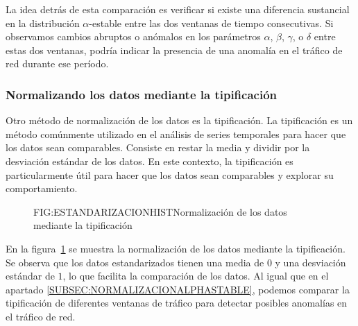 La idea detrás de esta comparación es verificar si existe una diferencia sustancial en la distribución $\alpha$-estable entre las dos ventanas de tiempo consecutivas. Si observamos cambios abruptos o anómalos en los parámetros $\alpha$, $\beta$, $\gamma$, o $\delta$ entre estas dos ventanas, podría indicar la presencia de una anomalía en el tráfico de red durante ese período.

\subsubsection{Normalizando los datos mediante la tipificaci\'on}\label{SUBSEC:NORMALIZACIONTIPIFICACION}

Otro método de normalización de los datos es la tipificación. La tipificación es un método comúnmente utilizado en el análisis de series temporales para hacer que los datos sean comparables. Consiste en restar la media y dividir por la desviación estándar de los datos. En este contexto, la tipificación es particularmente útil para hacer que los datos sean comparables y explorar su comportamiento.

\begin{figure}[Normalización de los datos mediante la tipificación]{FIG:ESTANDARIZACIONHIST}{Normalización de los datos mediante la tipificación}
    \label{FIG:ESTANDARIZACIONHIST}
\end{figure}

En la figura~\ref{FIG:ESTANDARIZACIONHIST} se muestra la normalización de los datos mediante la tipificación. Se observa que los datos estandarizados tienen una media de $0$ y una desviación estándar de $1$, lo que facilita la comparación de los datos. 
Al igual que en el apartado \ref{SUBSEC:NORMALIZACIONALPHASTABLE}, podemos comparar la tipificación de diferentes ventanas de tráfico para detectar posibles anomalías en el tráfico de red. 

